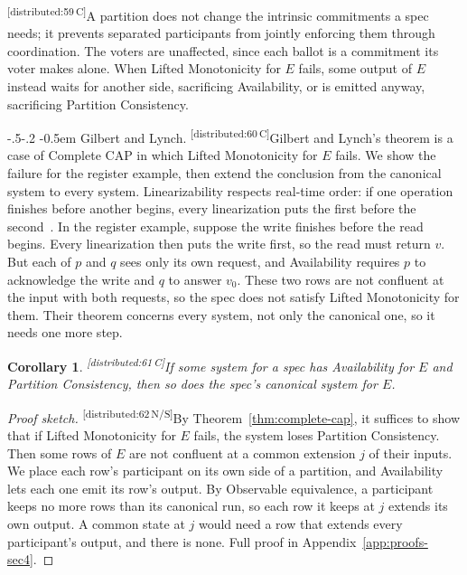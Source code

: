 \documentclass[sigconf]{cidr-2027}
\makeatletter
\newtheorem{corollary}{Corollary}
\theoremstyle{remark}
\renewcommand\paragraph{\@startsection{paragraph}{4}{\z@}%
  {-.5\baselineskip \@plus -2\p@ \@minus -.2\p@}%
  {-0.5em}%
  {\normalfont\bfseries}}
\newcommand{\commitment}{commitment\xspace}
\newcommand{\commitments}{commitments\xspace}
\newcommand{\outrel}{extends\xspace}          %
\newcommand{\cxtag}[2]{\textsuperscript{\textsf{\tiny[#1\,#2]}}}
\makeatother
\begin{document}
\color{black!45}\cxtag{distributed:59}{C}A partition does not change the intrinsic \commitments a spec needs; it
prevents separated participants from jointly enforcing them through
coordination.  The voters are unaffected, since each ballot is a \commitment
its voter makes alone.  When Lifted Monotonicity for $E$ fails, some output of
$E$ instead waits for another side, sacrificing Availability, or is emitted
anyway, sacrificing Partition Consistency.\color{black}

\paragraph{Gilbert and Lynch.}
\color{black!45}\cxtag{distributed:60}{C}Gilbert and Lynch's theorem is a case of Complete CAP in which Lifted Monotonicity for $E$ fails. We show the failure for the register example, then extend the conclusion from the canonical system to every system.  Linearizability
respects real-time order: if one operation finishes before another begins,
every linearization puts the first before the
second~\cite{herlihy1990linearizability}.  In the register example, suppose the
write finishes before the read begins.  Every linearization then puts the write
first, so the read must return $v$.  But each of $p$ and $q$ sees only its own
request, and Availability requires $p$ to acknowledge the write and $q$ to
answer $v_0$.  These two rows are not confluent at the input with both requests, so
the spec does not satisfy Lifted Monotonicity for them.  Their theorem
concerns every system, not only the canonical one, so it needs one more step.\color{black}

\color{black!45}\begin{corollary}
\label{cor:complete-cap-any-system}
\cxtag{distributed:61}{C}If some system for a spec has Availability for $E$ and Partition Consistency,
then so does the spec's canonical system for $E$.\color{black}
\end{corollary}

\color{black}\begin{proof}[Proof sketch]
\cxtag{distributed:62}{N/S}By Theorem~\ref{thm:complete-cap}, it suffices to show that if Lifted
Monotonicity for $E$ fails, the system loses Partition Consistency.  Then some
rows of $E$ are not confluent at a common extension $j$ of their inputs.  We place each row's participant on
its own side of a partition, and Availability lets each one emit its row's
output.  By Observable equivalence, a participant keeps no more rows than its
canonical run, so each row it keeps at $j$ \outrel its own output.  A common
state at $j$ would need a row that \outrel every participant's output, and
there is none.  Full proof in Appendix~\ref{app:proofs-sec4}.\color{black}
\end{proof}
\end{document}
